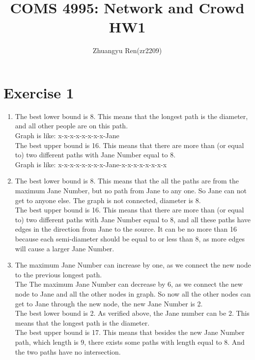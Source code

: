 \documentclass[12pt]{article}
\begin{document}
 
 
 
\title{COMS 4995: Network and Crowd HW1}%
%
\author{Zhuangyu Ren(zr2209)\\ %
} %
 
\maketitle
 \indent 
\section*{Exercise 1}
\begin{enumerate}
	\item 
	The best lower bound is 8. This means that the longest path is the diameter, and all other people are on this path.\\
	Graph is like: x-x-x-x-x-x-x-x-Jane\\
	The best upper bound is 16. This means that there are more than (or equal to) two different paths with Jane Number equal to 8.\\
	Graph is like: x-x-x-x-x-x-x-x-Jane-x-x-x-x-x-x-x-x\\
	
	\item
	The best lower bound is 8. This means that the all the paths are from the maximum Jane Number, but no path from Jane to any one. So Jane can not get to anyone else. The graph is not connected, diameter is 8.\\
	The best upper bound is 16. This means that there are more than (or equal to) two different paths with Jane Number equal to 8, and all these paths have edges in the direction from Jane to the source. It can be no more than 16 because each semi-diameter should be equal to or less than 8, as more edges will cause a larger Jane Number.
	
	\item
	The maximum Jane Number can increase by one, as we connect the new node to the previous longest path.\\
	The The maximum Jane Number can decrease by 6, as we connect the new node to Jane and all the other nodes in graph. So now all the other nodes can get to Jane through the new node, the new Jane Number is 2.\\
	The best lower bound is 2. As verified above, the Jane number can be 2. This means that the longest path is the diameter.\\
	The best upper bound is 17. This means that besides the new Jane Number path, which length is 9,  there exists some paths with length equal to 8. And the two paths have no intersection.
\end{enumerate}
\end{document}
